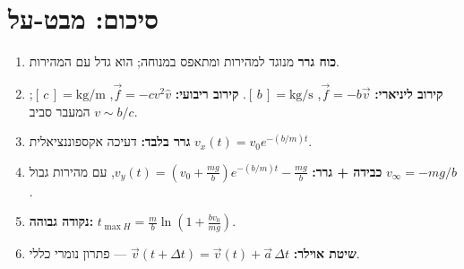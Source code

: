 \documentclass[12pt, a4paper]{article}
\newcommand{\hvec}[1]{\overrightarrow{#1}}
\begin{document}
\section*{סיכום: מבט-על}

\begin{tcolorbox}[warnbox, title={נקודות מפתח לזכור}]
\begin{enumerate}
  \item \textbf{כוח גרר} מנוגד למהירות ומתאפס במנוחה; הוא גדל עם המהירות.
  \item \textbf{קירוב ליניארי:} \textenglish{$\hvec{f} = -b\hvec{v}$}, \textenglish{$[\,b\,]=\text{kg}/\text{s}$}.
        \textbf{קירוב ריבועי:} \textenglish{$\hvec{f} = -c v^2\hat{v}$}, \textenglish{$[\,c\,]=\text{kg}/\text{m}$};
        המעבר סביב \textenglish{$v \sim b/c$}.
  \item \textbf{גרר בלבד:} דעיכה אקספוננציאלית \textenglish{$v_x(t) = v_0 e^{-(b/m)t}$}.
  \item \textbf{כבידה + גרר:} \textenglish{$v_y(t) = \left(v_0 + \tfrac{mg}{b}\right)e^{-(b/m)t} - \tfrac{mg}{b}$},
        עם מהירות גבול \textenglish{$v_\infty = -mg/b$}.
  \item \textbf{נקודה גבוהה:} \textenglish{$t_{\max H} = \tfrac{m}{b}\ln\!\left(1 + \tfrac{bv_0}{mg}\right)$}.
  \item \textbf{שיטת אוילר:} \textenglish{$\hvec{v}(t+\Delta t) = \hvec{v}(t) + \hvec{a}\,\Delta t$} --- פתרון נומרי כללי.
\end{enumerate}
\end{tcolorbox}
\end{document}
